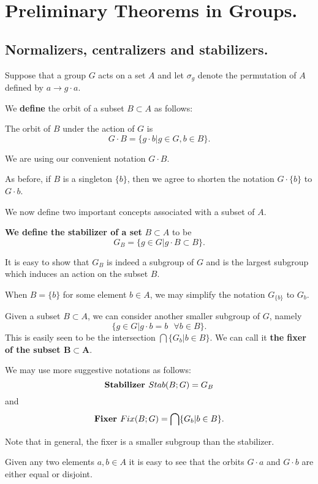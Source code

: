 \documentclass[12pt]{article}
\begin{document}
\section{Preliminary Theorems in Groups.}
\subsection{Normalizers, centralizers and
stabilizers.} 
 

Suppose that a group $G$ acts on a set $A$ and let $\sigma_g$ denote the
permutation of $A$ defined by $a \rightarrow g\cdot a$.


We {\bf define} the orbit of a subset $B\subset A$ as follows:

The orbit of $B$ under the action of $G$ is 
$$G\cdot B = \{ g \cdot b | g \in G, b\in B\}.$$

We are using our convenient notation $G\cdot B$.

As before, if $B$ is a singleton $\{b\}$, then we agree to shorten the
notation  $G\cdot \{b\}$ to $G\cdot b$.

We now define two important concepts associated with a subset of $A$.

{\bf We define the stabilizer of a set}  $B\subset A$ to be
$$G_B = \{g \in G | g\cdot B \subset B\}.$$

It is easy to show that $G_B$ is indeed a subgroup of $G$ and is the 
largest subgroup which induces an action on the subset $B$.

When $B=\{b\}$ for some element $b\in A$, we may simplify the notation
$G_{\{b\}}$ to $G_b$.

Given a subset $B\subset A$, we can consider another smaller subgroup
of $G$, namely 
$$\{g\in G | g\cdot b = b \ \ \  \forall b \in B\}.$$
This is easily seen to be the intersection $\bigcap\{G_b | b \in B\}$.
 We can call it {\bf the fixer of 
the subset $\mathbf{B\subset A}$}.

We may use more suggestive notations as follows:
$$\mbox{\bf Stabilizer     } Stab(B;G) = G_B$$
and 
$$\mbox{\bf Fixer     } Fix(B;G) = \bigcap\{G_b| b \in B \}.$$

Note that in general,  the fixer is a smaller subgroup than the stabilizer.

Given any two elements $a,b\in A$ it is easy to see that the orbits 
$G\cdot a$ and
$G\cdot b$ are either equal or disjoint. 
\end{document}
